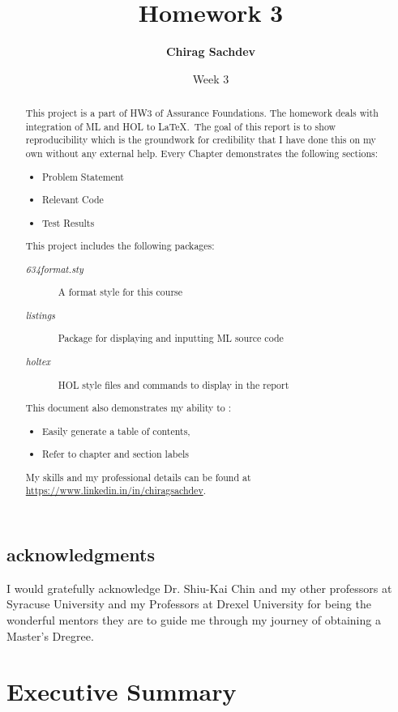 \documentclass{report}
\title{Homework 3}
\author{\textbf{Chirag Sachdev}}
\date{Week 3}
\begin{document}
\lstset{language=ML}
\maketitle{}

\begin{abstract}
This project is a part of HW3 of Assurance Foundations. The homework deals with integration of ML and HOL to \LaTeX.\ The goal of this report is to show reproducibility which is the groundwork for credibility that I have done this on my own without any external help. Every Chapter demonstrates the following sections:
	\begin{itemize}
		\item Problem Statement
		\item Relevant Code
		\item Test Results
	\end{itemize}
	
This project includes the following packages:
	\begin{description}
		\item[\emph{634format.sty}] A format style for this course
		\item[\emph{listings}] Package for displaying and inputting ML source code
		\item[\emph{holtex}] HOL style files and commands to display in the report
	\end{description}

This document also demonstrates my ability to :
	\begin{itemize}
		\item Easily generate a table of contents,
		\item Refer to chapter and section labels
	\end{itemize}

My skills and my professional details can be found at \url{https://www.linkedin.in/in/chiragsachdev}.
\end{abstract}

\section*{acknowledgments}
I would gratefully acknowledge Dr. Shiu-Kai Chin and my other professors at Syracuse University and my Professors at Drexel University for being the wonderful mentors they are to guide me through my journey of obtaining a Master's Dregree.

\tableofcontents{}

\chapter{Executive Summary}
\label{cha:executive-summary}
\end{document}
